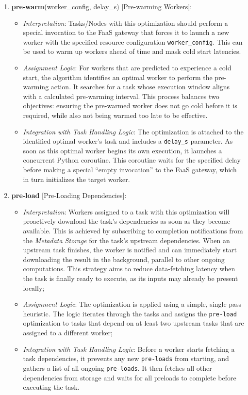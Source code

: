 \documentclass[conference]{IEEEtran}
\begin{document}
\begin{enumerate}
\item\textbf{pre-warm}(worker\_config, delay\_s) [Pre-warming Workers]:
\begin{itemize}
\item \textit{Interpretation}: Tasks/Nodes with this optimization should perform a special invocation to the FaaS gateway that forces it to launch a new worker with the specified resource configuration \texttt{worker\_config}. This can be used to warm up workers ahead of time and mask cold start latencies.
\item \textit{Assignment Logic}: For workers that are predicted to experience a cold start, the algorithm identifies an optimal worker to perform the pre-warming action. It searches for a task whose execution window aligns with a calculated pre-warming interval. This process balances two objectives: ensuring the pre-warmed worker does not go cold before it is required, while also not being warmed too late to be effective.
\item \textit{Integration with Task Handling Logic}: The optimization is attached to the identified optimal worker's task and includes a \texttt{delay\_s} parameter. As soon as this optimal worker begins its own execution, it launches a concurrent Python coroutine. This coroutine waits for the specified delay before making a special “empty invocation” to the FaaS gateway, which in turn initializes the target worker.
\end{itemize}

\item\textbf{pre-load} [Pre-Loading Dependencies]:
\begin{itemize}
\item \textit{Interpretation}: Workers assigned to a task with this optimization will proactively download the task's dependencies as soon as they become available. This is achieved by subscribing to completion notifications from the \textit{Metadata Storage} for the task's upstream dependencies. When an upstream task finishes, the worker is notified and can immediately start downloading the result in the background, parallel to other ongoing computations. This strategy aims to reduce data-fetching latency when the task is finally ready to execute, as its inputs may already be present locally;
\item \textit{Assignment Logic}: The optimization is applied using a simple, single-pass heuristic. The logic iterates through the tasks and assigns the \texttt{pre-load} optimization to tasks that depend on at least two upstream tasks that are assigned to a different worker;
\item \textit{Integration with Task Handling Logic}: Before a worker starts fetching a task dependencies, it prevents any new \texttt{pre-loads} from starting, and gathers a list of all ongoing \texttt{pre-loads}. It then fetches all other dependencies from storage and waits for all preloads to complete before executing the task.
\end{itemize}


\end{enumerate}
\end{document}

